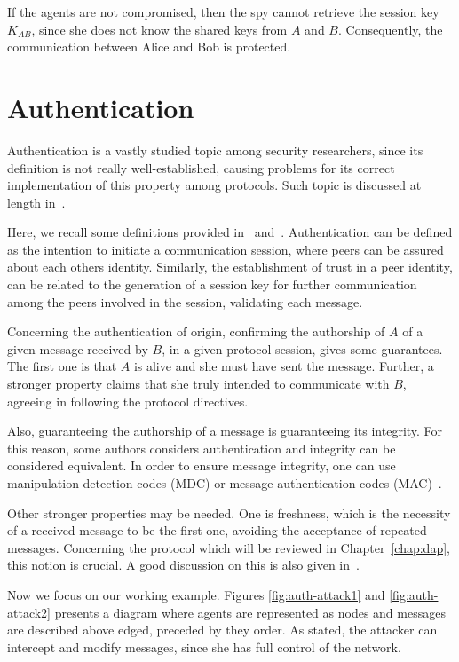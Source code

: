 If the agents are not compromised, then the spy cannot retrieve the session key \(K_{AB}\), since she does not know the shared keys from \(A\) and \(B\). Consequently, the communication between Alice and Bob is protected.





\section{Authentication}\label{sec:protocols:auth}
Authentication is a vastly studied topic among security researchers, since its definition is not really well-established, causing problems for its correct implementation of this property among protocols. Such topic is discussed at length in~\cite{Gollmann2000}.

Here, we recall some definitions provided in~\cite{Diffie92} and~\cite{RyanSchneider2010}. Authentication can be defined as the intention to initiate a communication session, where peers can be assured about each others identity. Similarly, the establishment of trust in a peer identity, can be related to the generation of a session key for further communication among the peers involved in the session, validating each message.

Concerning the authentication of origin, confirming the authorship of \(A\) of a given message received by \(B\), in a given protocol session, gives some guarantees. The first one is that \(A\) is alive and she must have sent the message. Further, a stronger property claims that she truly intended to communicate with \(B\), agreeing in following the protocol directives.

Also, guaranteeing the authorship of a message is guaranteeing its integrity. For this reason, some authors \cite{Bella2007} considers authentication and integrity can be considered equivalent. In order to ensure message integrity, one can use manipulation detection codes (MDC) or message authentication codes (MAC)~\cite{ross-security}.

Other stronger properties may be needed. One is freshness, which is the necessity of a received message to be the first one, avoiding the acceptance of repeated messages. Concerning the protocol which will be reviewed in Chapter~\ref{chap:dap}, this notion is crucial. A good discussion on this is also given in~\cite{Gollmann2000}.

Now we focus on our working example. Figures \ref{fig:auth-attack1} and \ref{fig:auth-attack2} presents a diagram where agents are represented as nodes and messages are described above edged, preceded by they order. As stated, the attacker can intercept and modify messages, since she has full control of the network.

